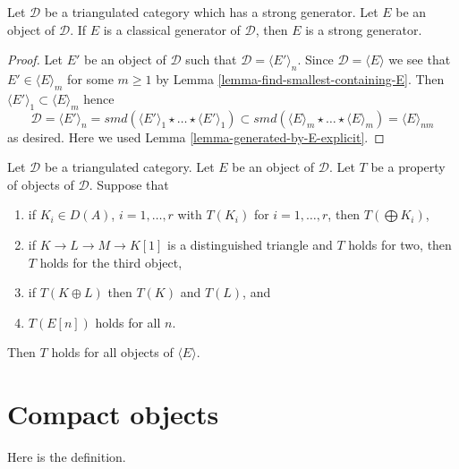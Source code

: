\begin{lemma}
\label{lemma-classical-generator-strong-generator}
Let $\mathcal{D}$ be a triangulated category which has a strong generator.
Let $E$ be an object of $\mathcal{D}$. If $E$ is a classical generator of
$\mathcal{D}$, then $E$ is a strong generator.
\end{lemma}

\begin{proof}
Let $E'$ be an object of $\mathcal{D}$ such that
$\mathcal{D} = \langle E' \rangle_n$. Since
$\mathcal{D} = \langle E \rangle$ we see that $E' \in \langle E \rangle_m$
for some $m \geq 1$ by Lemma \ref{lemma-find-smallest-containing-E}.
Then $\langle E' \rangle_1 \subset \langle E \rangle_m$ hence
$$
\mathcal{D} =
\langle E' \rangle_n = smd(
\langle E' \rangle_1 \star \ldots \star \langle E' \rangle_1)
\subset
smd(
\langle E \rangle_m \star \ldots \star \langle E \rangle_m)
=
\langle E \rangle_{nm}
$$
as desired. Here we used Lemma \ref{lemma-generated-by-E-explicit}.
\end{proof}

\begin{remark}
\label{remark-check-on-generator}
Let $\mathcal{D}$ be a triangulated category. Let $E$ be an object
of $\mathcal{D}$. Let $T$ be a property of objects of $\mathcal{D}$.
Suppose that
\begin{enumerate}
\item if $K_i \in D(A)$, $i = 1, \ldots, r$ with
$T(K_i)$ for $i = 1, \ldots, r$, then $T(\bigoplus K_i)$,
\item if $K \to L \to M \to K[1]$ is a distinguished triangle and
$T$ holds for two, then $T$ holds for the third object,
\item if $T(K \oplus L)$ then $T(K)$ and $T(L)$, and
\item $T(E[n])$ holds for all $n$.
\end{enumerate}
Then $T$ holds for all objects of $\langle E \rangle$.
\end{remark}












\section{Compact objects}
\label{section-compact}

\noindent
Here is the definition.

